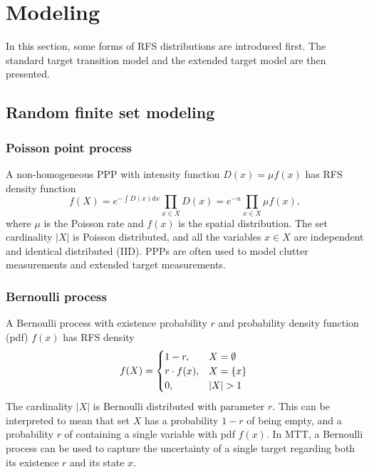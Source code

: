 \section{Modeling}
In this section, some forms of RFS distributions are introduced first. The standard target transition model and the extended target model are then presented. 

\subsection{Random finite set modeling}
\subsubsection{Poisson point process}
A non-homogeneous PPP
with intensity function $D(x)=\mu f(x)$ has RFS density function \cite{pmbmextended2}
\begin{equation}
    f(X) = e^{-\int D(x)dx}\prod_{x\in X}D(x)=e^{-u}\prod_{x\in X}\mu f(x),
    \label{eq:poisson}
\end{equation}
where $\mu$ is the Poisson rate and $f(x)$ is the spatial distribution. The set cardinality $|X|$ is Poisson distributed, and all the variables $x\in X$ are independent and identical distributed (IID). PPPs are often used to model clutter measurements and extended target measurements.

\subsubsection{Bernoulli process}
A Bernoulli process with existence probability $r$ and probability density function (pdf) $f(x)$ has RFS density
\begin{equation}
f(X) = 
\begin{cases}
    1-r,& X=\emptyset\\
    r\cdot f(x),& X=\{x\}\\
    0,& |X| > 1
\end{cases}
\label{eq:bernoulli}\\
\end{equation}
The cardinality $|X|$ is Bernoulli distributed with parameter $r$. This can be interpreted to mean that set $X$ has a probability $1-r$ of being empty, and a probability $r$ of containing a single variable with pdf $f(x)$. In MTT, a Bernoulli process can be used to capture the uncertainty of a single target regarding both its existence $r$ and its state $x$. 

